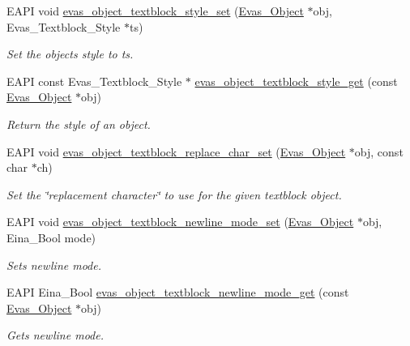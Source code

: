 \begin{DoxyCompactItemize}
EAPI void \hyperlink{group__Evas__Object__Textblock_gaf581b9400cb7176a137451ab6193e3c0}{evas\_\-object\_\-textblock\_\-style\_\-set} (\hyperlink{group__Evas__Object__Group_ga9e19e6dd1f517a0ba437c0114d3e7c97}{Evas\_\-Object} $\ast$obj, Evas\_\-Textblock\_\-Style $\ast$ts)
\begin{DoxyCompactList}\small\item\em Set the objects style to ts. \item\end{DoxyCompactList}\item 
EAPI const Evas\_\-Textblock\_\-Style $\ast$ \hyperlink{group__Evas__Object__Textblock_ga9f3164f28981c6d6188a8de202848197}{evas\_\-object\_\-textblock\_\-style\_\-get} (const \hyperlink{group__Evas__Object__Group_ga9e19e6dd1f517a0ba437c0114d3e7c97}{Evas\_\-Object} $\ast$obj)
\begin{DoxyCompactList}\small\item\em Return the style of an object. \item\end{DoxyCompactList}\item 
EAPI void \hyperlink{group__Evas__Object__Textblock_gab5d3958f4d73b2d9e3cccd828816b672}{evas\_\-object\_\-textblock\_\-replace\_\-char\_\-set} (\hyperlink{group__Evas__Object__Group_ga9e19e6dd1f517a0ba437c0114d3e7c97}{Evas\_\-Object} $\ast$obj, const char $\ast$ch)
\begin{DoxyCompactList}\small\item\em Set the \char`\"{}replacement character\char`\"{} to use for the given textblock object. \item\end{DoxyCompactList}\item 
EAPI void \hyperlink{group__Evas__Object__Textblock_gae637041b07efe438e3539bb549a915e3}{evas\_\-object\_\-textblock\_\-newline\_\-mode\_\-set} (\hyperlink{group__Evas__Object__Group_ga9e19e6dd1f517a0ba437c0114d3e7c97}{Evas\_\-Object} $\ast$obj, Eina\_\-Bool mode)
\begin{DoxyCompactList}\small\item\em Sets newline mode. \item\end{DoxyCompactList}\item 
EAPI Eina\_\-Bool \hyperlink{group__Evas__Object__Textblock_ga0832ab9fd2820efee68bec6d1d80e427}{evas\_\-object\_\-textblock\_\-newline\_\-mode\_\-get} (const \hyperlink{group__Evas__Object__Group_ga9e19e6dd1f517a0ba437c0114d3e7c97}{Evas\_\-Object} $\ast$obj)
\begin{DoxyCompactList}\small\item\em Gets newline mode. \item\end{DoxyCompactList}\item 

\end{DoxyCompactItemize}
